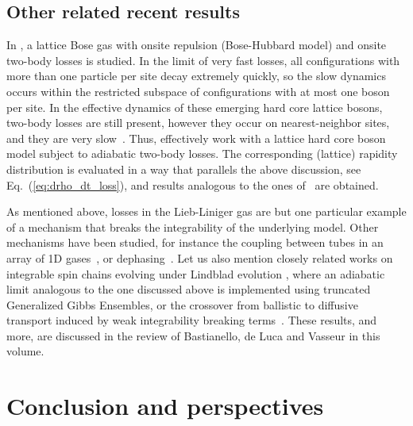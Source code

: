 \documentclass[onecolumn,amsfonts,showpacs,superscriptaddress]{revtex4-1}
\begin{document}
\subsection{Other related recent results}

In \citep{rossini2020strong}, a lattice Bose gas with onsite repulsion (Bose-Hubbard model) and onsite two-body losses is studied. In the limit of very fast losses, all configurations with more than one particle per site decay extremely quickly, so the slow dynamics occurs within the restricted subspace of configurations with at most one boson per site. In the effective dynamics of these emerging hard core lattice bosons, two-body losses are still present, however they occur on nearest-neighbor sites, and they are very slow~\citep{garcia2009dissipation}. Thus, \cite{rossini2020strong} effectively work with a lattice hard core boson model subject to adiabatic two-body losses. The corresponding (lattice) rapidity distribution is evaluated in a way that parallels the above discussion, see Eq.~(\ref{eq:drho_dt_loss}), and results analogous to the ones of~\citep{bouchoule_effect_2020} are obtained.

\vspace{0.5cm}

As mentioned above, losses in the Lieb-Liniger gas are but one particular example of a mechanism that breaks the integrability of the underlying model. Other mechanisms have been studied, for instance the coupling between tubes in an array of 1D gases~\citep{caux2019hydrodynamics}, or dephasing~\citep{bastianello2020generalized}. Let us also mention closely related works on integrable spin chains evolving under Lindblad evolution  \citep{lange2017pumping,lange2018time,lenarvcivc2018perturbative}, where an adiabatic limit analogous to the one discussed above is implemented using truncated Generalized Gibbs Ensembles, or the crossover from ballistic to diffusive transport induced by weak integrability breaking terms~\citep{friedman2020diffusive,vznidarivc2020weak}. These results, and more, are discussed in the review of Bastianello, de Luca and Vasseur in this volume.





\newpage


\section*{Conclusion and perspectives}
\end{document}
